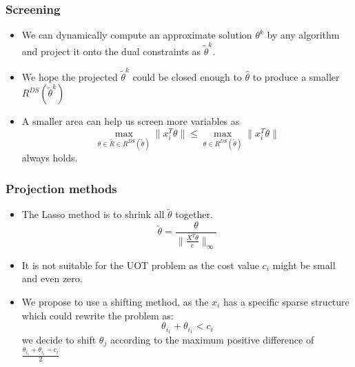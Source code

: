 \documentclass[dvipdfmx,cjk,t,10pt]{beamer}
\begin{document}
\begin{frame}
\frametitle{Screening}
	\begin{itemize}
		\item We can dynamically compute an approximate solution $\theta^{k}$ by any algorithm and project it onto the dual constraints as $\tilde{\theta}^{k}$.
		\item We hope the projected $\tilde{\theta}^{k}$ could be closed enough to $\hat{\theta}$ to produce a smaller $R^{DS}(\tilde{\theta}^{k})$
		\item A smaller area can help us screen more variables as 
		$$
		\max_{\theta \in \tilde{R} \in R^{DS}(\tilde{\theta})}{\|x_i^{T}\theta\|} \leq \max_{\theta \in R^{DS}(\tilde{\theta})}{\|x_i^{T}\theta\|} 
		$$
		always holds.

	\end{itemize}
	
\end{frame}


\begin{frame}
\frametitle{Projection methods}
	\begin{itemize}
		\item The Lasso method is to shrink all $\tilde{\theta}$ together.
		$$
			\tilde{\theta} = \frac{\theta}{\|\frac{X^{T}\theta}{c}\|_{\infty}}
		$$
	
		\item It is not suitable for the UOT problem as the cost value $c_{i}$ might be small and even zero. 
		\item We propose to use a shifting method, as the $x_{i}$ has a specific sparse structure which could rewrite the problem as:
		$$
		\theta_{i_{1}}+\theta_{i_{1}}<c_i
		$$
		we decide to shift $\theta_{j}$ according to the maximum positive difference of $	\frac{\theta_{i_{1}}+\theta_{i_{1}}-c_i}{2}$
	\end{itemize}
\end{frame}
\end{document}
